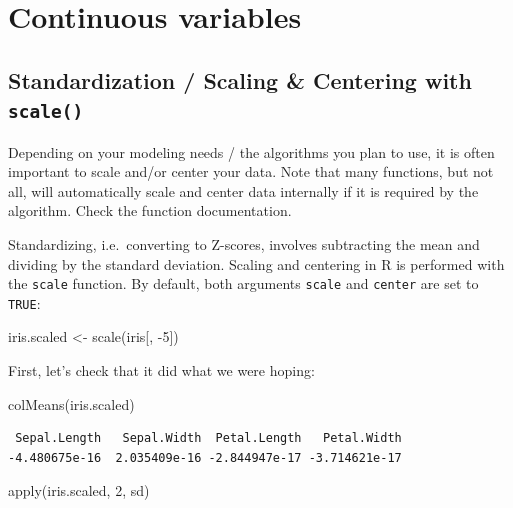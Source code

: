 \documentclass[
]{book}
\newenvironment{Shaded}{\begin{snugshade}}{\end{snugshade}}
\newcommand{\DecValTok}[1]{\textcolor[rgb]{0.00,0.00,0.81}{#1}}
\newcommand{\FunctionTok}[1]{\textcolor[rgb]{0.00,0.00,0.00}{#1}}
\newcommand{\NormalTok}[1]{#1}
\newcommand{\OtherTok}[1]{\textcolor[rgb]{0.56,0.35,0.01}{#1}}
\newcommand{\SpecialCharTok}[1]{\textcolor[rgb]{0.00,0.00,0.00}{#1}}
\begin{document}
\hypertarget{continuous-variables}{%
\section{Continuous variables}\label{continuous-variables}}

\hypertarget{zscore}{%
\subsection{\texorpdfstring{Standardization / Scaling \& Centering with \texttt{scale()}}{Standardization / Scaling \& Centering with scale()}}\label{zscore}}

Depending on your modeling needs / the algorithms you plan to use, it is often important to scale and/or center your data. Note that many functions, but not all, will automatically scale and center data internally if it is required by the algorithm. Check the function documentation.

Standardizing, i.e.~converting to Z-scores, involves subtracting the mean and dividing by the standard deviation.
Scaling and centering in R is performed with the \texttt{scale} function. By default, both arguments \texttt{scale} and \texttt{center} are set to \texttt{TRUE}:

\begin{Shaded}
\begin{Highlighting}[]
\NormalTok{iris.scaled }\OtherTok{\textless{}{-}} \FunctionTok{scale}\NormalTok{(iris[, }\SpecialCharTok{{-}}\DecValTok{5}\NormalTok{])}
\end{Highlighting}
\end{Shaded}

First, let's check that it did what we were hoping:

\begin{Shaded}
\begin{Highlighting}[]
\FunctionTok{colMeans}\NormalTok{(iris.scaled)}
\end{Highlighting}
\end{Shaded}

\begin{verbatim}
 Sepal.Length   Sepal.Width  Petal.Length   Petal.Width 
-4.480675e-16  2.035409e-16 -2.844947e-17 -3.714621e-17 
\end{verbatim}

\begin{Shaded}
\begin{Highlighting}[]
\FunctionTok{apply}\NormalTok{(iris.scaled, }\DecValTok{2}\NormalTok{, sd)}
\end{Highlighting}
\end{Shaded}
\end{document}
